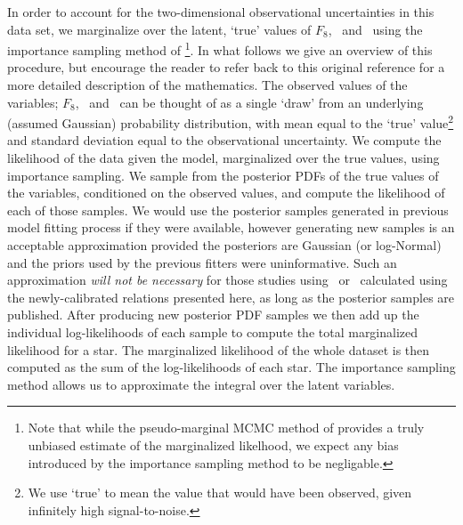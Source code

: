 In order to account for the two-dimensional observational uncertainties in
this data set, we marginalize over the latent, `true' values of $F_8$,
\rhostar\ and \logg\ using the importance sampling method of
\citep{hogg:2010}\footnote{Note that while the pseudo-marginal MCMC method of
\citep{andrieu:2009} provides a truly unbiased estimate of the marginalized
likelhood, we expect any bias introduced by the importance sampling method to
be negligable.}.
In what follows we give an overview of this procedure, but encourage the reader
to refer back  to this original reference for a more detailed description of
the mathematics.
The observed values of the variables; $F_8$, \rhostar\ and \logg\ can be thought
of as a single `draw' from an underlying (assumed Gaussian) probability
distribution, with mean equal to the `true' value\footnote{We use `true' to
mean the value that would have been observed, given infinitely high
signal-to-noise.} and standard deviation equal to the observational
uncertainty.
We compute the likelihood of the data given the model, marginalized over the
true values, using importance sampling.
We sample from the posterior PDFs of the true values of the variables,
conditioned on the observed values, and compute the likelihood of each of those
samples.
We would use the posterior samples generated in previous model fitting process
if they were available, however generating new samples is an acceptable
approximation provided the posteriors are Gaussian (or log-Normal) and the
priors used by the previous fitters were uninformative.
Such an approximation {\it will not be necessary} for those studies using
\rhostar\ or \logg\ calculated using the newly-calibrated relations
presented here, as long as the posterior samples are published.
After producing new posterior PDF samples we then add up the individual
log-likelihoods of each sample to compute the total marginalized likelihood
for a star.
The marginalized likelihood of the whole dataset is then computed as the sum
of the log-likelihoods of each star.
The importance sampling method allows us to approximate the integral over the
latent variables.

